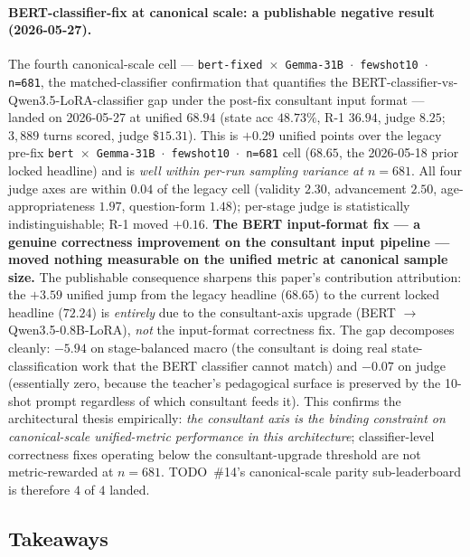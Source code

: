 \documentclass[11pt]{article}
\begin{document}
\paragraph{BERT-classifier-fix at canonical scale: a publishable negative result (2026-05-27).} The fourth canonical-scale cell --- \texttt{bert-fixed $\times$ Gemma-31B $\cdot$ fewshot10 $\cdot$ n=681}, the matched-classifier confirmation that quantifies the BERT-classifier-vs-Qwen3.5-LoRA-classifier gap under the post-fix consultant input format --- landed on 2026-05-27 at unified $\mathbf{68.94}$ (state acc $48.73\%$, R-1 $36.94$, judge $8.25$; $3{,}889$ turns scored, judge $\$15.31$). This is $+0.29$ unified points over the legacy pre-fix \texttt{bert $\times$ Gemma-31B $\cdot$ fewshot10 $\cdot$ n=681} cell ($68.65$, the 2026-05-18 prior locked headline) and is \emph{well within per-run sampling variance at $n{=}681$}. All four judge axes are within $0.04$ of the legacy cell (validity $2.30$, advancement $2.50$, age-appropriateness $1.97$, question-form $1.48$); per-stage judge is statistically indistinguishable; R-1 moved $+0.16$. \textbf{The BERT input-format fix --- a genuine correctness improvement on the consultant input pipeline --- moved nothing measurable on the unified metric at canonical sample size.} The publishable consequence sharpens this paper's contribution attribution: the $+3.59$ unified jump from the legacy headline ($68.65$) to the current locked headline ($72.24$) is \emph{entirely} due to the consultant-axis upgrade (BERT $\to$ Qwen3.5-0.8B-LoRA), \emph{not} the input-format correctness fix. The gap decomposes cleanly: $-5.94$ on stage-balanced macro (the consultant is doing real state-classification work that the BERT classifier cannot match) and $-0.07$ on judge (essentially zero, because the teacher's pedagogical surface is preserved by the 10-shot prompt regardless of which consultant feeds it). This confirms the architectural thesis empirically: \emph{the consultant axis is the binding constraint on canonical-scale unified-metric performance in this architecture}; classifier-level correctness fixes operating below the consultant-upgrade threshold are not metric-rewarded at $n{=}681$. TODO~\#14's canonical-scale parity sub-leaderboard is therefore $4$ of $4$ landed.

\subsection{Takeaways}
\label{sec:takeaways}
\end{document}
